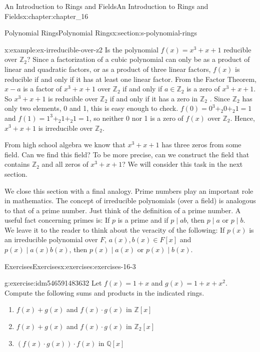 \documentclass[oneside,10pt,]{book}
\numberwithin{equation}{section}
\begin{document}
\begin{chapterptx}{An Introduction to Rings and Fields}{}{An Introduction to Rings and Fields}{}{}{x:chapter:chapter_16}
\begin{sectionptx}{Polynomial Rings}{}{Polynomial Rings}{}{}{x:section:s-polynomial-rings}
\begin{example}{}{x:example:ex-irreducible-over-z2}
Is the polynomial \(f(x) = x^3 + x + 1\) reducible over \(\mathbb{Z}_2\)? Since a factorization of a cubic polynomial can only be as a product of linear and quadratic factors, or as a product of three linear factors, \(f(x)\) is reducible if and only if it has at least one linear  factor. From the Factor Theorem,  \(x - a\) is a factor of \(x^3 + x + 1\) over \(\mathbb{Z}_2\) if and only if \(a \in \mathbb{Z}_2\) is a zero of \(x^3 + x + 1\). So \(x^3 + x + 1\) is reducible over \(\mathbb{Z}_2\) if and only if it has a zero in \(\mathbb{Z}_2\) . Since \(\mathbb{Z}_2\) has only two elements, 0 and 1, this is easy enough to check.  \(f(0) = 0^3 +_2 0+_2 1= 1\)   and \(f(1) =1^3 +_2 1 +_2 1 = 1\), so neither 0 nor 1 is a zero of \(f(x)\) over \(\mathbb{Z}_2\). Hence, \(x^3 + x + 1\) is irreducible over \(\mathbb{Z}_2\).%
\end{example}
From high school algebra we know that \(x^3 + x + 1\) has three zeros from some field. Can we find this field? To be more precise, can we construct the field that contains \(\mathbb{Z}_2\) and all zeros of \(x^3 + x + 1\)? We will consider this task in the next section.%
\par
We close this section with a final analogy. Prime numbers play an important role in mathematics. The concept of irreducible polynomials (over a field) is analogous to that of a prime number. Just think of the definition of a prime number. A useful fact concerning primes is: If \(p\) is a prime and if \(p \mid a b\), then \(p  \mid  a\) or \(p  \mid  b\). We leave it to the reader to think about the veracity of the following: If \(p(x)\) is an irreducible polynomial over \(F\), \(a(x), b(x) \in F[x]\) and \(p(x) \mid a(x) b(x)\), then \(p(x) \mid a(x)\) or \(p(x) \mid b(x)\).%
%
%
\typeout{************************************************}
\typeout{************************************************}
%
\begin{exercises-subsection}{Exercises}{}{Exercises}{}{}{x:exercises:exercises-16-3}
\begin{divisionexercise}{1}{}{}{g:exercise:idm546591483632}%
Let \(f(x) = 1 + x\) and \(g(x) = 1 + x + x^2\). Compute the following sums and products in the indicated rings.%
\begin{enumerate}[label=(\alph*)]
\item{}\(f(x) + g(x)\) and \(f(x) \cdot  g(x)\) in \(\mathbb{Z}[x]\)%
\item{}\(f(x) + g(x)\) and \(f(x) \cdot  g(x)\) in \(\mathbb{Z}_2[x]\)%
\item{}\((f(x)\cdot  g(x))\cdot f(x)\)  in \(\mathbb{Q}[x]\)%

\end{enumerate}
\end{divisionexercise}
\end{exercises-subsection}
\end{sectionptx}
\end{chapterptx}
\end{document}
